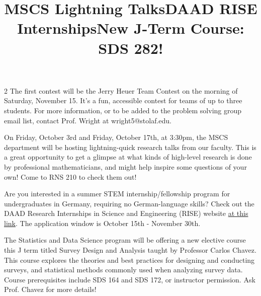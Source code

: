 \documentclass[12pt]{article}
\newcommand{\bolder}{\textbf}
\begin{document}
\begin{multicols}{2}
The first contest will be the Jerry Heuer Team Contest on the morning of Saturday, November 15. It's a fun, accessible contest for teams of up to three students. For more information, or to be added to the problem solving group email list, contact Prof. Wright at wright5@stolaf.edu.


\begin{tcolorbox}[colback=white, colframe=black]
    \begin{center}
    \title{{\large \bolder{MSCS Lightning Talks}}}
    \end{center}
\end{tcolorbox}

On Friday, October 3rd and Friday, October 17th, at 3:30pm, the MSCS department will be hosting lightning-quick research talks from our faculty. This is a great opportunity to get a glimpse at what kinds of high-level research is done by professional mathematicians, and might help inspire some questions of your own! Come to RNS 210 to check them out!



\begin{tcolorbox}[colback=white, colframe=black]
    \begin{center}
    \title{{\large \bolder{DAAD RISE Internships}}}
    \end{center}
\end{tcolorbox}

Are you interested in a summer STEM internship/fellowship program for undergraduates in Germany, requiring no German-language skills? Check out the DAAD Research Internships in Science and Engineering (RISE) website \href{https://www.daad.de/rise/en/}{at this link}. The application window is October 15th - November 30th.


 \begin{tcolorbox}[colback=white, colframe=black]
    \begin{center}
    \title{{\large \bolder{New J-Term Course: SDS 282!}}}
    \end{center}
\end{tcolorbox}
The Statistics and Data Science program will be offering a new elective course this J term titled Survey Design and Analysis taught by Professor Carlos Chavez. This course explores the theories and best practices for designing and conducting surveys, and statistical methods commonly used when analyzing survey data. Course prerequisites include SDS 164 and SDS 172, or instructor permission. Ask Prof. Chavez for more details!  



\end{multicols}
\end{document}
